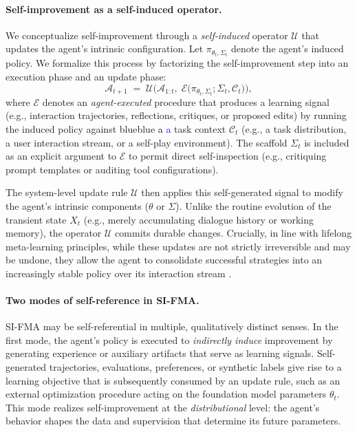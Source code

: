\documentclass{article}
\let\oldtextcolor\textcolor
\renewcommand{\textcolor}[2]{
  \def\temp{#1}
  \def\red{blue}
  \ifx\temp\red
    \oldtextcolor{black}{#2}
  \else
    \oldtextcolor{#1}{#2}
  \fi
}
\begin{document}
\paragraph{Self-improvement as a self-induced operator.}
We conceptualize self-improvement through a \emph{self-induced} operator $\mathcal{U}$ that updates the agent’s intrinsic configuration. Let $\pi_{\theta_t,\Sigma_t}$ denote the agent’s induced policy. We formalize this process by factorizing the self-improvement step into an execution phase and an update phase:
\begin{equation}
\mathcal{A}_{t+1} \;=\; \mathcal{U}\Big(\mathcal{A}_{1:t},\; \mathcal{E}\big(\pi_{\theta_{t},\Sigma_{t}};\Sigma_{t},\mathcal{C}_{t}\big)\Big),
\end{equation}
where $\mathcal{E}$ denotes an \emph{agent-executed} procedure that produces a learning signal (e.g., interaction trajectories, reflections, critiques, or proposed edits) by running the induced policy against \textcolor{blue}{a} task context $\mathcal{C}_t$ (e.g., a task distribution, a user interaction stream, or a self-play environment). The scaffold $\Sigma_t$ is included as an explicit argument to $\mathcal{E}$ to permit direct self-inspection (e.g., critiquing prompt templates or auditing tool configurations). 

The system-level update rule $\mathcal{U}$ then applies this self-generated signal to modify the agent's intrinsic components ($\theta$ or $\Sigma$). Unlike the routine evolution of the transient state $X_t$ (e.g., merely accumulating dialogue history or working memory), the operator $\mathcal{U}$ commits durable changes. Crucially, in line with lifelong meta-learning principles, while these updates are not strictly irreversible and may be undone, they allow the agent to consolidate successful strategies into an increasingly stable policy over its interaction stream \citep{Schmidhuber1994OnLH, schmidhuber1995beyond, DBLP:conf/icml/WieringS96, schmidhuber1996simple}.


\paragraph{Two modes of self-reference in SI-FMA.}
SI-FMA may be self-referential in multiple, qualitatively distinct senses. In the first mode, the agent’s policy is executed to \emph{indirectly induce} improvement by generating experience or auxiliary artifacts that serve as learning signals. Self-generated trajectories, evaluations, preferences, or synthetic labels give rise to a learning objective that is subsequently consumed by an update rule, such as an external optimization procedure acting on the foundation model parameters $\theta_t$. This mode realizes self-improvement at the \emph{distributional} level: the agent’s behavior shapes the data and supervision that determine its future parameters.
\end{document}
